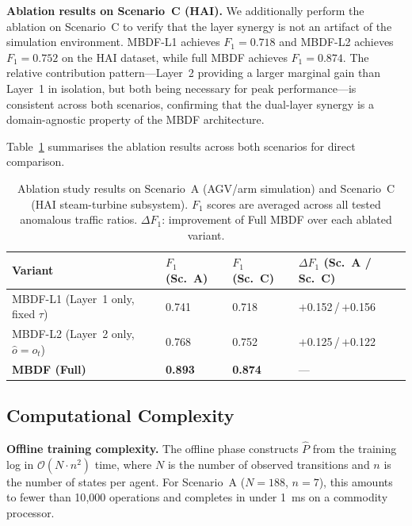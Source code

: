 \documentclass[manuscript,screen,review]{acmart}
\begin{document}
\textbf{Ablation results on Scenario~C (HAI).}
We additionally perform the ablation on Scenario~C to
verify that the layer synergy is not an artifact of the
simulation environment. MBDF-L1 achieves $F_1 = 0.718$
and MBDF-L2 achieves $F_1 = 0.752$ on the HAI dataset,
while full MBDF achieves $F_1 = 0.874$. The relative
contribution pattern---Layer~2 providing a larger
marginal gain than Layer~1 in isolation, but both being
necessary for peak performance---is consistent across
both scenarios, confirming that the dual-layer synergy
is a domain-agnostic property of the MBDF architecture.

Table~\ref{tab:ablation} summarises the ablation results
across both scenarios for direct comparison.

\begin{table}[!t]
\renewcommand{\arraystretch}{1.3}
\caption{Ablation study results on Scenario~A (AGV/arm
simulation) and Scenario~C (HAI steam-turbine subsystem).
$F_1$ scores are averaged across all tested anomalous
traffic ratios. $\Delta F_1$: improvement of Full MBDF
over each ablated variant.}
\label{tab:ablation}
\centering
\small
\begin{tabular}{llll}
\toprule
\textbf{Variant} &
\textbf{$F_1$ (Sc.~A)} &
\textbf{$F_1$ (Sc.~C)} &
\textbf{$\Delta F_1$ (Sc.~A / Sc.~C)} \\
\midrule
MBDF-L1 (Layer~1 only, fixed $\tau$) &
  0.741 & 0.718 & $+$0.152\,/\,$+$0.156 \\
MBDF-L2 (Layer~2 only, $\hat{o}=o_{t}$) &
  0.768 & 0.752 & $+$0.125\,/\,$+$0.122 \\
\textbf{MBDF (Full)} &
  \textbf{0.893} & \textbf{0.874} & --- \\
\bottomrule
\end{tabular}
\end{table}

\subsection{Computational Complexity}
\label{sec:complexity}

\textbf{Offline training complexity.}
The offline phase constructs $\hat{P}$ from the training
log in $\mathcal{O}(N \cdot n^2)$ time, where $N$ is the
number of observed transitions and $n$ is the number of
states per agent. For Scenario~A ($N = 188$, $n = 7$),
this amounts to fewer than 10{,}000 operations and
completes in under 1~ms on a commodity processor.
\end{document}
